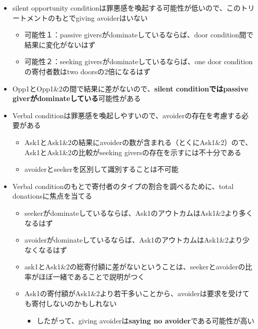 \documentclass[../root]{subfiles}
\begin{document}
    \begin{itemize}
        \item silent opportunity conditionは罪悪感を喚起する可能性が低いので、このトリートメントのもとでgiving avoiderはいない
        \begin{itemize}
            \item 可能性１：passive giversがdominateしているならば、door condition間で結果に変化がないはず
            \item 可能性２：seeking giversがdominateしているならば、one door conditionの寄付者数はtwo doorsの2倍になるはず
        \end{itemize}
        \item Opp1とOpp1\&2の間で結果に差がないので、\textbf{silent conditionではpassive giverがdominateしている}可能性がある
        \item Verbal conditionは罪悪感を喚起しやすいので、avoiderの存在を考慮する必要がある
        \begin{itemize}
            \item Ask1とAsk1\&2の結果にavoiderの数が含まれる（とくにAsk1\&2）ので、Ask1とAsk1\&2の比較がseeking giversの存在を示すには不十分である
            \item avoiderとseekerを区別して識別することは不可能
        \end{itemize}
        \item Verbal conditionのもとで寄付者のタイプの割合を調べるために、total donationsに焦点を当てる
        \begin{itemize}
            \item seekerがdominateしているならば、Ask1のアウトカムはAsk1\&2より多くなるはず
            \item avoiderがdominateしているならば、Ask1のアウトカムはAsk1\&2より少なくなるはず
            \item ask1とAsk1\&2の総寄付額に差がないということは、seekerとavoiderの比率がほぼ一緒であることで説明がつく
            \item Ask1の寄付額がAsk1\&2より若干多いことから、avoiderは要求を受けても寄付しないのかもしれない
            \begin{itemize}
                \item したがって、giving avoiderは\textbf{saying no avoider}である可能性が高い
            \end{itemize}
        \end{itemize}
    \end{itemize}

    \biblio
\end{document}
